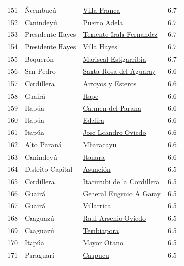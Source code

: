 {\begin{longtable}[]{@{}llll@{}}
151 & Ñeembucú & \hyperref[dist:12_Neembucu:Villa_Franca]{Villa Franca} & 6.7 \\
152 & Canindeyú & \hyperref[dist:14_Canindeyu:Puerto_Adela]{Puerto Adela} & 6.7 \\
153 & Presidente Hayes & \hyperref[dist:15_Presidente_Hayes:Teniente_Irala_Fernandez]{Teniente Irala Fernandez} & 6.7 \\
154 & Presidente Hayes & \hyperref[dist:15_Presidente_Hayes:Villa_Hayes]{Villa Hayes} & 6.7 \\
155 & Boquerón & \hyperref[dist:16_Boqueron:Mariscal_Estigarribia]{Mariscal Estigarribia} & 6.7 \\
156 & San Pedro & \hyperref[dist:02_San_Pedro:Santa_Rosa_del_Aguaray]{Santa Rosa del Aguaray} & 6.6 \\
157 & Cordillera & \hyperref[dist:03_Cordillera:Arroyos_y_Esteros]{Arroyos y Esteros} & 6.6 \\
158 & Guairá & \hyperref[dist:04_Guaira:Itape]{Itape} & 6.6 \\
159 & Itapúa & \hyperref[dist:07_Itapua:Carmen_del_Parana]{Carmen del Parana} & 6.6 \\
160 & Itapúa & \hyperref[dist:07_Itapua:Edelira]{Edelira} & 6.6 \\
161 & Itapúa & \hyperref[dist:07_Itapua:Jose_Leandro_Oviedo]{Jose Leandro Oviedo} & 6.6 \\
162 & Alto Paraná & \hyperref[dist:10_Alto_Parana:Mbaracayu]{Mbaracayu} & 6.6 \\
163 & Canindeyú & \hyperref[dist:14_Canindeyu:Itanara]{Itanara} & 6.6 \\
164 & Distrito Capital & \hyperref[dist:00_Distrito_Capital:Asunción]{Asunción} & 6.5 \\
165 & Cordillera & \hyperref[dist:03_Cordillera:Itacurubi_de_la_Cordillera]{Itacurubi de la Cordillera} & 6.5 \\
166 & Guairá & \hyperref[dist:04_Guaira:General_Eugenio_A_Garay]{General Eugenio A Garay} & 6.5 \\
167 & Guairá & \hyperref[dist:04_Guaira:Villarrica]{Villarrica} & 6.5 \\
168 & Caaguazú & \hyperref[dist:05_Caaguazu:Raul_Arsenio_Oviedo]{Raul Arsenio Oviedo} & 6.5 \\
169 & Caaguazú & \hyperref[dist:05_Caaguazu:Tembiapora]{Tembiapora} & 6.5 \\
170 & Itapúa & \hyperref[dist:07_Itapua:Mayor_Otano]{Mayor Otano} & 6.5 \\
171 & Paraguarí & \hyperref[dist:09_Paraguari:Caapucu]{Caapucu} & 6.5 \\

\end{longtable}}
